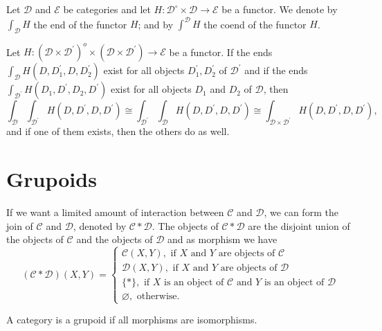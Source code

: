 Let $\mathcal{D}$ and $\mathcal{E}$ be categories and let $H: \mathcal{D}^{\circ} \times \mathcal{D} \rightarrow \mathcal{E}$ be a functor. We denote by $\int_{\mathcal{D}} H$ the end of the functor $H$; and by $\int^{\mathcal{D}} H$ the coend of the functor $H$.\\

\begin{prop} Let $H:\left(\mathcal{D} \times \mathcal{D}^{\prime}\right)^o \times\left(\mathcal{D} \times \mathcal{D}^{\prime}\right) \rightarrow \mathcal{E}$ be a functor. If the ends $\int_{\mathcal{D}} H\left(D, D_1^{\prime}, D, D_2^{\prime}\right)$ exist for all objects $D_1^{\prime}, D_2^{\prime}$ of $\mathcal{D}^{\prime}$ and if the ends $\int_{\mathcal{D}^{\prime}} H\left(D_1, D^{\prime}, D_2, D^{\prime}\right)$ exist for all objects $D_1$ and $D_2$ of $\mathcal{D}$, then
$$
\int_{\mathcal{D}} \int_{\mathcal{D}^{\prime}} H\left(D, D^{\prime}, D, D^{\prime}\right) \cong \int_{\mathcal{D}^{\prime}} \int_{\mathcal{D}} H\left(D, D^{\prime}, D, D^{\prime}\right) \cong \int_{\mathcal{D} \times \mathcal{D}^{\prime}} H\left(D, D^{\prime}, D, D^{\prime}\right),
$$
and if one of them exists, then the others do as well.
\end{prop} 



\section{Grupoids}

If we want a limited amount of interaction between $\mathcal{C}$ and $\mathcal{D}$, we can form the join of $\mathcal{C}$ and $\mathcal{D}$, denoted by $\mathcal{C} * \mathcal{D}$. The objects of $\mathcal{C} * \mathcal{D}$ are the disjoint union of the objects of $\mathcal{C}$ and the objects of $\mathcal{D}$ and as morphism we have
$$
(\mathcal{C} * \mathcal{D})(X, Y)=\left\{\begin{array}{l}
\mathcal{C}(X, Y), \text { if } X \text { and } Y \text { are objects of } \mathcal{C} \\
\mathcal{D}(X, Y), \text { if } X \text { and } Y \text { are objects of } \mathcal{D} \\
\{*\}, \text { if } X \text { is an object of } \mathcal{C} \text { and } Y \text { is an object of } \mathcal{D} \\
\varnothing, \text { otherwise. }
\end{array}\right.
$$

A category is a grupoid if all morphisms are isomorphisms.

